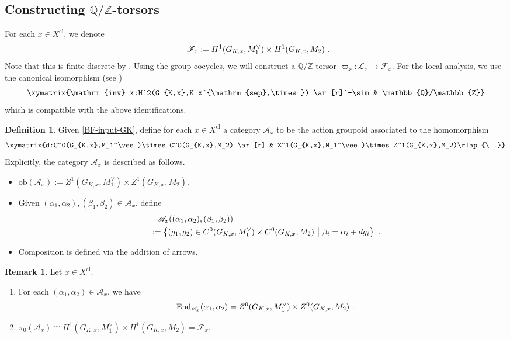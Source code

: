 \documentclass[a4paper]{amsart}
\theoremstyle{definition}
\newtheorem{defn}[thm]{Definition}
\newtheorem{rmk}[thm]{Remark}
\numberwithin{equation}{section}
\begin{document}
\subsection{Constructing $\mathbb{Q}/\mathbb{Z}$-torsors}\label{Localthy-torsor}

For each $x\in X^\mathrm{cl}$, we denote
\begin{align*}
    \mathscr{F}_x:=H^1(G_{K,x},M_1^\vee)\times H^1(G_{K,x},M_2)\rlap{\ .}
\end{align*}
Note that this is finite discrete by \cite[Theorem 7.1.8]{NSW08}. Using the group cocycles, we will construct a $\mathbb{Q}/\mathbb{Z}$-torsor $\varpi_x:\mathscr{L}_x\rightarrow\mathscr{F}_x$. For the local analysis, we use the canonical isomorphism (see \cite[I.A]{Mil06})
\begin{align}\label{Local-H2-inv}
    \xymatrix{\mathrm{inv}_x:H^2(G_{K,x},K_x^{\mathrm{sep},\times}) \ar[r]^-\sim & \mathbb{Q}/\mathbb{Z}}
\end{align}
which is compatible with the above identifications.

\begin{defn} Given \eqref{BF-input-GK}, define for each $x\in X^\mathrm{cl}$ a category $\mathscr{A}_x$ to be the action groupoid associated to the homomorphism
\begin{align*}
    \xymatrix{d:C^0(G_{K,x},M_1^\vee)\times C^0(G_{K,x},M_2) \ar[r] & Z^1(G_{K,x},M_1^\vee)\times Z^1(G_{K,x},M_2)\rlap{\ .}}
\end{align*}
Explicitly, the category $\mathscr{A}_x$ is described as follows.
\begin{itemize}
    \item $\mathrm{ob}(\mathscr{A}_x):=Z^1(G_{K,x},M_1^\vee)\times Z^1(G_{K,x},M_2)$.
    \item Given $(\alpha_1,\alpha_2),(\beta_1,\beta_2)\in\mathscr{A}_x$, define
    \begin{align*}
        &\quad\mathscr{A}_x((\alpha_1,\alpha_2),(\beta_1,\beta_2))\\
        &:=\left\{(g_1,g_2)\in C^0(G_{K,x},M_1^\vee)\times C^0(G_{K,x},M_2)\ \middle|\ \beta_i=\alpha_i+dg_i\right\}\rlap{\ .}
    \end{align*}
    \item Composition is defined via the addition of arrows.
\end{itemize}
\end{defn}



\begin{rmk}\label{Rmk-Cx} Let $x\in X^\mathrm{cl}$.
\begin{enumerate}
    \item For each $(\alpha_1,\alpha_2)\in\mathscr{A}_x$, we have
    \begin{align*}
        \mathrm{End}_{\mathscr{A}_x}(\alpha_1,\alpha_2)=Z^0(G_{K,x},M_1^\vee)\times Z^0(G_{K,x},M_2)\rlap{\ .}
    \end{align*}
    \item $\pi_0(\mathscr{A}_x)\cong H^1(G_{K,x},M_1^\vee)\times H^1(G_{K,x},M_2)=\mathscr{F}_x$.
\end{enumerate}
\end{rmk}
\end{document}
